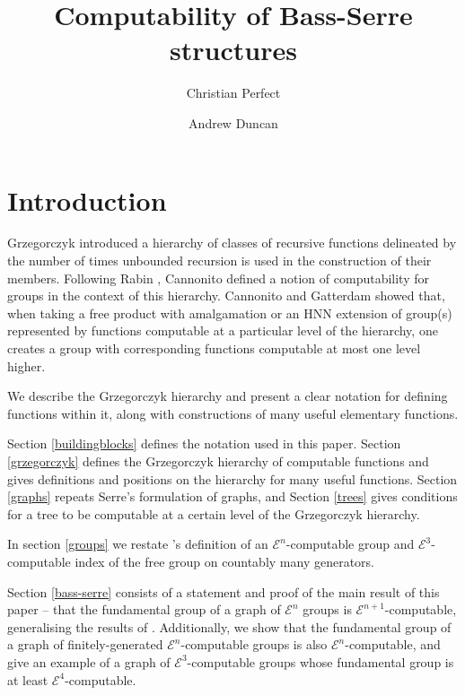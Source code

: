 \documentclass[a4paper]{article}
\newcommand{\grz}[1]{$\mathcal{E}^{#1}$}	%
\theoremstyle{plain}
\theoremstyle{definition}
\begin{document}
\title{Computability of Bass-Serre structures}
\author{Christian Perfect \and Andrew Duncan}
\maketitle

\section*{Introduction}

Grzegorczyk \cite{Grzegorczyk_1953} introduced a hierarchy of classes of recursive functions delineated by the number of times unbounded recursion is used in the construction of their members. Following Rabin \cite{Rabin_1960}, Cannonito \cite{Cannonito_1966} defined a notion of computability for groups in the context of this hierarchy. Cannonito and Gatterdam \cite{Cannonito_1973} \cite{Gatterdam_1973} showed that, when taking a free product with amalgamation or an HNN extension of group(s) represented by functions computable at a particular level of the hierarchy, one creates a group with corresponding functions computable at most one level higher.

We describe the Grzegorczyk hierarchy and present a clear notation for defining functions within it, along with constructions of many useful elementary functions. 

Section \ref{buildingblocks} defines the notation used in this paper. Section \ref{grzegorczyk} defines the Grzegorczyk hierarchy of computable functions and gives definitions and positions on the hierarchy for many useful functions. Section \ref{graphs} repeats Serre's \cite{Serre_1977} formulation of graphs, and Section \ref{trees} gives conditions for a tree to be computable at a certain level of the Grzegorczyk hierarchy.

In section \ref{groups} we restate \cite{Cannonito_1966}'s definition of an \grz{n}-computable group and \grz{3}-computable index of the free group on countably many generators. 

Section \ref{bass-serre} consists of a statement and proof of the main result of this paper -- that the fundamental group of a graph of \grz{n} groups is \grz{n+1}-computable, generalising the results of \cite{Cannonito_1973}. Additionally, we show that the fundamental group of a graph of finitely-generated \grz{n}-computable groups is also \grz{n}-computable, and give an example of a graph of \grz{3}-computable groups whose fundamental group is at least \grz{4}-computable.
\end{document}

